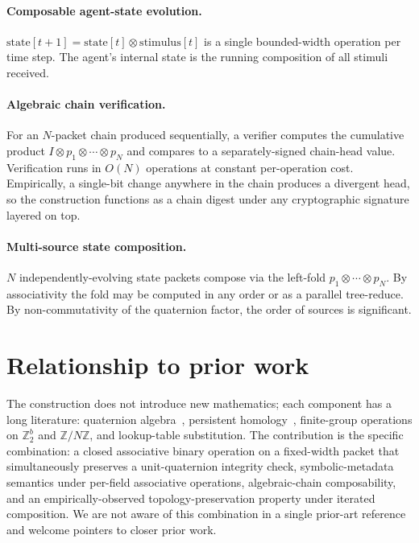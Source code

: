 \documentclass[11pt]{article}
\begin{document}
\paragraph{Composable agent-state evolution.}
$\mathrm{state}[t{+}1] = \mathrm{state}[t] \otimes \mathrm{stimulus}[t]$ is a
single bounded-width operation per time step. The agent's internal state is the
running composition of all stimuli received.

\paragraph{Algebraic chain verification.}
For an $N$-packet chain produced sequentially, a verifier computes the
cumulative product $I \otimes p_1 \otimes \cdots \otimes p_N$ and compares to a
separately-signed chain-head value. Verification runs in $O(N)$ operations at
constant per-operation cost. Empirically, a single-bit change anywhere in the
chain produces a divergent head, so the construction functions as a chain
digest under any cryptographic signature layered on top.

\paragraph{Multi-source state composition.}
$N$ independently-evolving state packets compose via the left-fold $p_1 \otimes
\cdots \otimes p_N$. By associativity the fold may be computed in any order or
as a parallel tree-reduce. By non-commutativity of the quaternion factor, the
order of sources is significant.

\section{Relationship to prior work}

The construction does not introduce new mathematics; each component has a long
literature: quaternion algebra~\cite{Hamilton1844}, persistent
homology~\cite{Edelsbrunner2002}, finite-group operations on $\mathbb{Z}_2^b$
and $\mathbb{Z}/N\mathbb{Z}$, and lookup-table substitution. The contribution
is the specific combination: a closed associative binary operation on a
fixed-width packet that simultaneously preserves a unit-quaternion integrity
check, symbolic-metadata semantics under per-field associative operations,
algebraic-chain composability, and an empirically-observed topology-preservation
property under iterated composition. We are not aware of this combination in a
single prior-art reference and welcome pointers to closer prior work.
\end{document}

